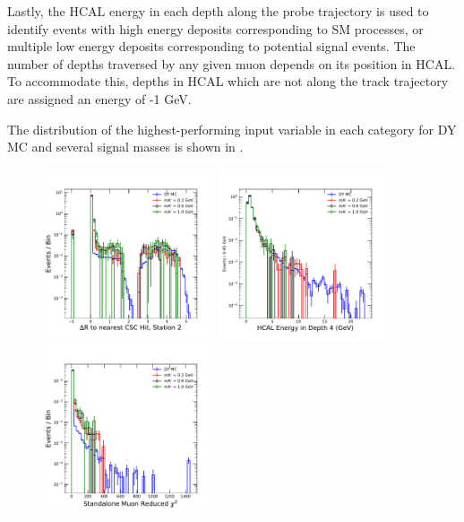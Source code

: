 Lastly, the HCAL energy in each depth along the probe trajectory is used to identify events with high energy deposits corresponding to SM processes, or multiple low energy deposits corresponding to potential signal events.
The number of depths traversed by any given muon depends on its position in HCAL.
To accommodate this, depths in HCAL which are not along the track trajectory are assigned an energy of -1 GeV. 

The distribution of the highest-performing input variable in each category for DY MC and several signal masses is shown in .

\begin{figure}[htpb]
	\centering
	\includegraphics[width=0.45\textwidth]{figures/bdtInputFeatscscDRbyStation_1.pdf}
	\hspace{0.01\textwidth}
	\includegraphics[width=0.45\textwidth]{figures/bdtInputFeatsHEDepth_4.pdf}
	\includegraphics[width=0.45\textwidth]{figures/bdtInputFeatsstaChi.pdf}

\end{figure}
